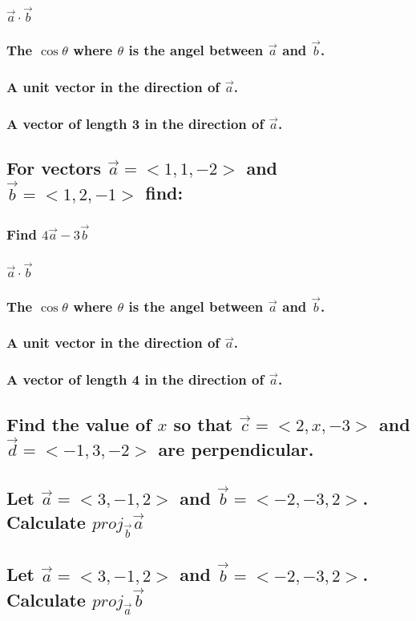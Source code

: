 \documentclass{article}
\begin{document}
\subsubsection{$\vec{a} \cdot \vec{b}$}
\subsubsection{The $\cos{\theta}$ where $\theta$ is the angel between $\vec{a}$ and $\vec{b}$.}
\subsubsection{A unit vector in the direction of $\vec{a}$.}
\subsubsection{A vector of length 3 in the direction of $\vec{a}$.}

\subsection{For vectors $\vec{a} = <1, 1, -2>$ and $\vec{b} = <1, 2, -1>$ find:}
\subsubsection{Find $4\vec{a} - 3\vec{b}$}
\subsubsection{$\vec{a} \cdot \vec{b}$}
\subsubsection{The $\cos{\theta}$ where $\theta$ is the angel between $\vec{a}$ and $\vec{b}$.}
\subsubsection{A unit vector in the direction of $\vec{a}$.}
\subsubsection{A vector of length 4 in the direction of $\vec{a}$.}

\subsection{Find the value of $x$ so that $\vec{c} = <2, x, -3>$ and $\vec{d} = <-1, 3, -2>$ are perpendicular.}

\subsection{Let $\vec{a} = <3, -1, 2>$ and $\vec{b} = <-2, -3, 2>$. Calculate $proj_{\vec{b}} \vec{a}$}

\subsection{Let $\vec{a} = <3, -1, 2>$ and $\vec{b} = <-2, -3, 2>$. Calculate $proj_{\vec{a}} \vec{b}$}
\end{document}
